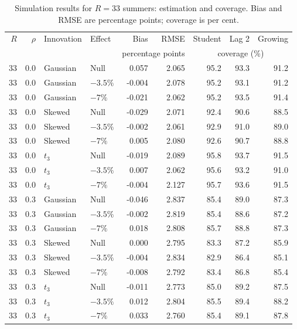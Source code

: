 \begin{table}[H]
\centering
\normalsize\renewcommand{\arraystretch}{1.55}\setlength{\tabcolsep}{4pt}
\caption{Simulation results for $R=33$ summers: estimation and coverage. Bias and RMSE are percentage points; coverage is per cent.}
\label{tab:year-simulation-complete-a-r33}
\begin{tabular*}{\textwidth}{@{\extracolsep{\fill}}rrllrrrrr}
\toprule
$R$ & $\rho$ & Innovation & Effect & Bias & RMSE & Student & Lag 2 & Growing \\
 & & & & \multicolumn{2}{c}{percentage points} & \multicolumn{3}{c}{coverage (\%)} \\
\midrule
33 & 0.0 & Gaussian & Null & 0.057 & 2.065 & 95.2 & 93.3 & 91.2 \\
33 & 0.0 & Gaussian & $-3.5\%$ & -0.004 & 2.078 & 95.2 & 93.1 & 91.2 \\
33 & 0.0 & Gaussian & $-7\%$ & -0.021 & 2.062 & 95.2 & 93.5 & 91.4 \\
33 & 0.0 & Skewed & Null & -0.029 & 2.071 & 92.4 & 90.6 & 88.5 \\
33 & 0.0 & Skewed & $-3.5\%$ & -0.002 & 2.061 & 92.9 & 91.0 & 89.0 \\
33 & 0.0 & Skewed & $-7\%$ & 0.005 & 2.080 & 92.6 & 90.7 & 88.8 \\
33 & 0.0 & $t_3$ & Null & -0.019 & 2.089 & 95.8 & 93.7 & 91.5 \\
33 & 0.0 & $t_3$ & $-3.5\%$ & 0.007 & 2.062 & 95.6 & 93.2 & 91.0 \\
33 & 0.0 & $t_3$ & $-7\%$ & -0.004 & 2.127 & 95.7 & 93.6 & 91.5 \\
33 & 0.3 & Gaussian & Null & -0.046 & 2.837 & 85.4 & 89.0 & 87.3 \\
33 & 0.3 & Gaussian & $-3.5\%$ & -0.002 & 2.819 & 85.4 & 88.6 & 87.2 \\
33 & 0.3 & Gaussian & $-7\%$ & 0.018 & 2.808 & 85.7 & 88.8 & 87.3 \\
33 & 0.3 & Skewed & Null & 0.000 & 2.795 & 83.3 & 87.2 & 85.9 \\
33 & 0.3 & Skewed & $-3.5\%$ & -0.004 & 2.834 & 82.9 & 86.4 & 85.1 \\
33 & 0.3 & Skewed & $-7\%$ & -0.008 & 2.792 & 83.4 & 86.8 & 85.4 \\
33 & 0.3 & $t_3$ & Null & -0.011 & 2.773 & 85.0 & 89.2 & 87.5 \\
33 & 0.3 & $t_3$ & $-3.5\%$ & 0.012 & 2.804 & 85.5 & 89.4 & 88.2 \\
33 & 0.3 & $t_3$ & $-7\%$ & 0.033 & 2.760 & 85.4 & 89.1 & 87.8 \\

\end{tabular*}
\end{table}
